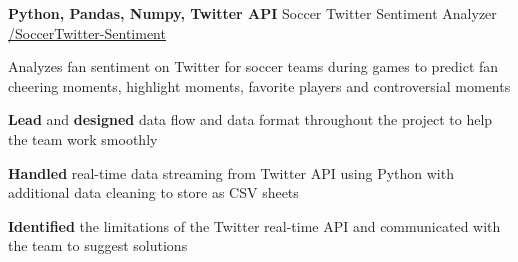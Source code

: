 
\begin{cventries}
    


  \cventry
    {\textbf{Python, Pandas, Numpy, Twitter API}} %
    {Soccer Twitter Sentiment Analyzer} %
    {\href{https://github.com/basulaib/SoccerTwitter-Sentiment}{\faGithub /SoccerTwitter-Sentiment}} %
    {} %
    {
      \begin{cvitems} %
        \item {Analyzes fan sentiment on Twitter for soccer teams during games to predict fan cheering moments, highlight moments, favorite players and controversial moments}
        \item {\textbf{Lead} and \textbf{designed} data flow and data format throughout the project to help the team work smoothly}
        \item {\textbf{Handled} real-time data streaming from Twitter API using Python with additional data cleaning to store as CSV sheets}
        \item {\textbf{Identified} the limitations of the Twitter real-time API and communicated with the team to suggest solutions}
      \end{cvitems}
    }
    


\end{cventries}
